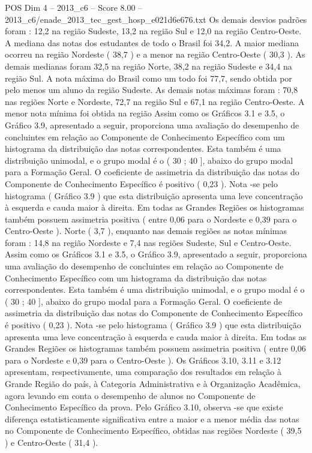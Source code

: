 \begin{textsample}{POS Dim 4 – 2013\_c6 – Score 8.00 – 2013\_c6/enade\_2013\_tec\_gest\_hosp\_e021d6e676.txt}
Os demais desvios padrões foram : 12,2 na região Sudeste, 13,2 na região Sul e 12,0 na região Centro-Oeste.
A mediana das notas dos estudantes de todo o Brasil foi 34,2.
A maior mediana ocorreu na região Nordeste ( 38,7 ) e a menor na região Centro-Oeste ( 30,3 ).
As demais medianas foram 32,5 na região Norte, 38,2 na região Sudeste e 34,4 na região Sul.
A nota máxima do Brasil como um todo foi 77,7, sendo obtida por pelo menos um aluno da região Sudeste.
As demais notas máximas foram : 70,8 nas regiões Norte e Nordeste, 72,7 na região Sul e 67,1 na região Centro-Oeste.
A menor nota mínima foi obtida na região Assim como os Gráficos 3.1 e 3.5, o Gráfico 3.9, apresentado a seguir, proporciona uma avaliação do desempenho de concluintes em relação ao Componente de Conhecimento Específico com um histograma da distribuição das notas correspondentes.
Esta também é uma distribuição unimodal, e o grupo modal é o ( 30 ; 40 ], abaixo do grupo modal para a Formação Geral.
O coeficiente de assimetria da distribuição das notas do Componente de Conhecimento Específico é positivo ( 0,23 ).
Nota -se pelo histograma ( Gráfico 3.9 ) que esta distribuição apresenta uma leve concentração à esquerda e cauda maior à direita.
Em todas as Grandes Regiões os histogramas também possuem assimetria positiva ( entre 0,06 para o Nordeste e 0,39 para o Centro-Oeste ).
Norte ( 3,7 ), enquanto nas demais regiões as notas mínimas foram : 14,8 na região Nordeste e 7,4 nas regiões Sudeste, Sul e Centro-Oeste.
Assim como os Gráficos 3.1 e 3.5, o Gráfico 3.9, apresentado a seguir, proporciona uma avaliação do desempenho de concluintes em relação ao Componente de Conhecimento Específico com um histograma da distribuição das notas correspondentes.
Esta também é uma distribuição unimodal, e o grupo modal é o ( 30 ; 40 ], abaixo do grupo modal para a Formação Geral.
O coeficiente de assimetria da distribuição das notas do Componente de Conhecimento Específico é positivo ( 0,23 ).
Nota -se pelo histograma ( Gráfico 3.9 ) que esta distribuição apresenta uma leve concentração à esquerda e cauda maior à direita.
Em todas as Grandes Regiões os histogramas também possuem assimetria positiva ( entre 0,06 para o Nordeste e 0,39 para o Centro-Oeste ).
Os Gráficos 3.10, 3.11 e 3.12 apresentam, respectivamente, uma comparação dos resultados em relação à Grande Região do país, à Categoria Administrativa e à Organização Acadêmica, agora levando em conta o desempenho de alunos no Componente de Conhecimento Específico da prova.
Pelo Gráfico 3.10, observa -se que existe diferença estatisticamente significativa entre a maior e a menor média das notas no Componente de Conhecimento Específico, obtidas nas regiões Nordeste ( 39,5 ) e Centro-Oeste ( 31,4 ).

\end{textsample}
